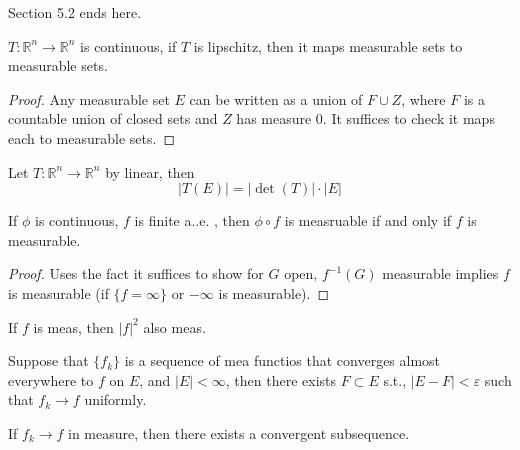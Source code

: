 \documentclass[openany]{book}
\newcommand{\R}{\mathbb{R}}
\begin{document}
Section 5.2 ends here.


\newpage


\begin{thm}[3.23]
    
\end{thm}

\begin{thm}[3.26]
    
\end{thm}


\begin{thm}[3.23]
    $T:\R^n\to\R^n$ is continuous, if $T$ is lipschitz, then it maps measurable sets to measurable sets.
\end{thm}
\begin{proof}
    Any measurable set $E$ can be written as a union of $F\cup Z$, where $F$ is a countable union of closed sets and $Z$ has measure $0$. It suffices to check it maps each to measurable sets.
\end{proof}


\begin{thm}[3.35]
    Let $T:\R^n\to\R^n$ by linear, then 
    \begin{equation*}
        |T(E)|=|\det(T)|\cdot|E|
    \end{equation*}
\end{thm}


\begin{thm}
    If $\phi$ is continuous, $f$ is finite a..e. , then $\phi\circ f$ is measruable if and only if $f$ is measurable.
\end{thm}
\begin{proof}
    Uses the fact it suffices to show for $G$ open, $f^{-1}(G)$ measurable implies $f$ is measurable (if $\{f=\infty\}$ or $-\infty$ is measurable).
\end{proof}

\begin{thm}[example]
    If $f$ is meas, then $|f|^2$ also meas.
\end{thm}


\begin{thm}[Egorov, 4.17]
    Suppose that $\{f_k\}$ is a sequence of mea functios that converges almost everywhere to $f$ on $E$, and $|E|<\infty$, then there exists $F\subset E$ s.t., $|E-F|<\varepsilon$ such that $f_k\to f$ uniformly.
\end{thm}



\begin{thm}[4.22]
    If $f_k\to f$ in measure, then there exists a convergent subsequence. 
\end{thm}
\end{document}
